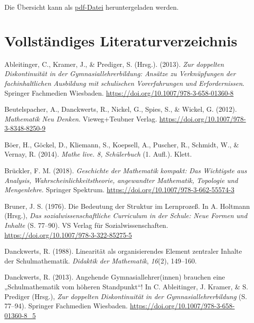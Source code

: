 \documentclass[
]{scrbook}
\newlength{\cslhangindent}
\newenvironment{CSLReferences}[2] %
 {\begin{list}{}{%
  \setlength{\itemindent}{0pt}
  \setlength{\leftmargin}{0pt}
  \setlength{\parsep}{0pt}
  \ifodd #1
   \setlength{\leftmargin}{\cslhangindent}
   \setlength{\itemindent}{-1\cslhangindent}
  \fi
  \setlength{\itemsep}{#2\baselineskip}}}
 {\end{list}}
\theoremstyle{definition}
\theoremstyle{definition}
\theoremstyle{definition}
\theoremstyle{definition}
\theoremstyle{remark}
\begin{document}
Die Übersicht kann als \href{files/Stoffdidaktik2024-OrientierungshilfeFormaleEbene.pdf}{pdf-Datei} heruntergeladen werden.

\chapter{Vollständiges Literaturverzeichnis}\label{vollstuxe4ndiges-literaturverzeichnis}

\label{refs}
\begin{CSLReferences}{1}{0}
Ableitinger, C., Kramer, J., \& Prediger, S. (Hrsg.). (2013). \emph{Zur doppelten {Diskontinuität} in der {Gymnasiallehrerbildung}: {Ansätze} zu {Verknüpfungen} der fachinhaltlichen {Ausbildung} mit schulischen {Vorerfahrungen} und {Erfordernissen}}. Springer Fachmedien Wiesbaden. \url{https://doi.org/10.1007/978-3-658-01360-8}

Beutelspacher, A., Danckwerts, R., Nickel, G., Spies, S., \& Wickel, G. (2012). \emph{Mathematik {Neu} {Denken}}. Vieweg+Teubner Verlag. \url{https://doi.org/10.1007/978-3-8348-8250-9}

Böer, H., Göckel, D., Kliemann, S., Koepsell, A., Puscher, R., Schmidt, W., \& Vernay, R. (2014). \emph{Mathe live. 8, {Schülerbuch}} (1. Aufl.). Klett.

Brückler, F. M. (2018). \emph{Geschichte der {Mathematik} kompakt: {Das} {Wichtigste} aus {Analysis}, {Wahrscheinlichkeitstheorie}, angewandter {Mathematik}, {Topologie} und {Mengenlehre}}. Springer Spektrum. \url{https://doi.org/10.1007/978-3-662-55574-3}

Bruner, J. S. (1976). Die {Bedeutung} der {Struktur} im {Lernprozeß}. In A. Holtmann (Hrsg.), \emph{Das sozialwissenschaftliche {Curriculum} in der {Schule}: {Neue} {Formen} und {Inhalte}} (S. 77--90). VS Verlag für Sozialwissenschaften. \url{https://doi.org/10.1007/978-3-322-85275-5}

Danckwerts, R. (1988). Linearität als organisierendes Element zentraler Inhalte der Schulmathematik. \emph{Didaktik der Mathematik}, \emph{16}(2), 149--160.

Danckwerts, R. (2013). Angehende {Gymnasiallehrer}(innen) brauchen eine „{Schulmathematik} vom höheren {Standpunkt}``! In C. Ableitinger, J. Kramer, \& S. Prediger (Hrsg.), \emph{Zur doppelten {Diskontinuität} in der {Gymnasiallehrerbildung}} (S. 77--94). Springer Fachmedien Wiesbaden. \url{https://doi.org/10.1007/978-3-658-01360-8_5}


\end{CSLReferences}
\end{document}
